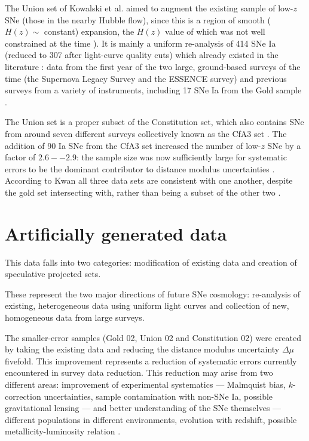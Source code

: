 The Union set of Kowalski et al. aimed to augment the existing sample of low-$z$ SNe (those in the nearby Hubble flow), since this is a region of smooth ($H(z) \sim{}$ constant) expansion, the $H(z)$ value of which was not well constrained at the time \cite{Kowalski2008}). It is mainly a uniform re-analysis of 414 SNe Ia (reduced to 307 after light-curve quality cuts) which already existed in the literature \cite{Kwan2009}: data from the first year of the two large, ground-based surveys of the time (the Supernova Legacy Survey and the ESSENCE survey) and previous surveys from a variety of instruments, including 17 SNe Ia from the Gold sample \cite{Kowalski2008}. 

The Union set is a proper subset of the Constitution set, which also contains SNe from around seven different surveys collectively known as the CfA3 set \cite{Hicken2009}. The addition of 90 Ia SNe from the CfA3 set increased the number of low-$z$ SNe by a factor of $2.6 -- 2.9$: the sample size was now sufficiently large for systematic errors to be the dominant contributor to distance modulus uncertainties \cite{Hicken2009}. According to Kwan all three data sets are consistent with one another, despite the gold set intersecting with, rather than being a subset of the other two \cite{Kwan2009}.

\section{Artificially generated data}
\label{sec:3.2}

This data falls into two categories: modification of existing data and creation of speculative projected sets. 

These represent the two major directions of future SNe cosmology: re-analysis of existing, heterogeneous data using uniform light curves and collection of new, homogeneous data from large surveys. 

The smaller-error samples (Gold 02, Union 02 and Constitution 02) were created by taking the existing data and reducing the distance modulus uncertainty $\Delta{} \mu$ fivefold. This improvement represents a reduction of systematic errors currently encountered in survey data reduction. This reduction may arise from two different areas: improvement of experimental systematics --- Malmquist bias, $k$-correction uncertainties, sample contamination with non-SNe Ia, possible gravitational lensing --- and better understanding of the SNe themselves --- different populations in different environments, evolution with redshift, possible metallicity-luminosity relation \cite{Lidman2010b}. 


